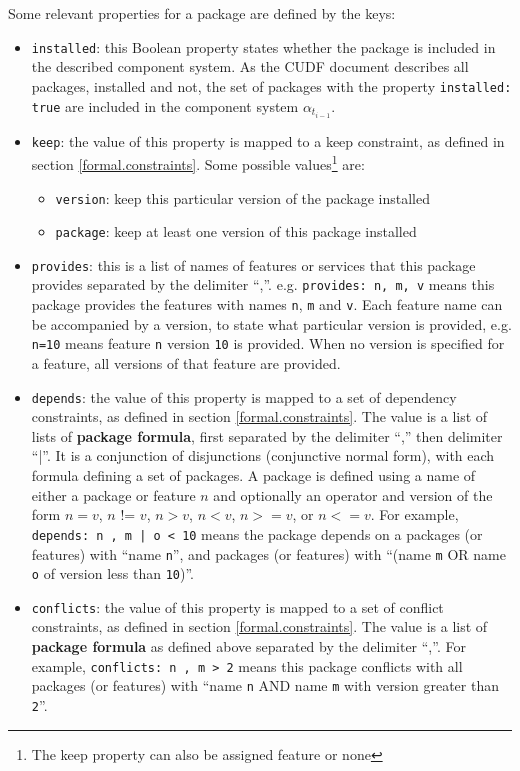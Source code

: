 Some relevant properties for a package are defined by the keys:
\begin{itemize}
  \item \verb+installed+: this Boolean property states whether the package is included in the described component system. 
  As the CUDF document describes all packages, installed and not, the set of packages with the property \verb+installed: true+ are included in the component system $\alpha_{t_{i-1}}$.
  \item \verb+keep+: the value of this property is mapped to a keep constraint, as defined in section \ref{formal.constraints}.
  Some possible values\footnote{The keep property can also be assigned feature or none} are:
	  	\begin{itemize}
	  		\item \verb+version+: keep this particular version of the package installed
	  		\item \verb+package+: keep at least one version of this package installed
		\end{itemize}
  \item \verb+provides+: this is a list of names of features or services that this package provides separated by the delimiter ``,''.
  e.g. \verb+provides: n, m, v+ means this package provides the features with names \verb+n+, \verb+m+ and \verb+v+.
  Each feature name can be accompanied by a version, to state what particular version is provided, e.g. \verb+n=10+ means feature \verb+n+ version \verb+10+ is provided.
  When no version is specified for a feature, all versions of that feature are provided.
  \item \verb+depends+: the value of this property is mapped to a set of dependency constraints, as defined in section \ref{formal.constraints}.
  The value is a list of lists of \textbf{package formula}, first separated by the delimiter ``,'' then delimiter ``|''.
  It is a conjunction of disjunctions (conjunctive normal form), with each formula defining a set of packages.
  A package is defined using a name of either a package or feature $n$ and optionally an operator and version of the form  $n = v$, $n$ != $v$, $n > v$, $n < v$, $n >= v$, or $n <= v$.
  For example, \verb+depends: n , m | o < 10+ means the package depends on a packages (or features) with ``name \verb+n+'',
   and  packages (or features) with ``(name \verb+m+ OR name \verb+o+ of version less than \verb+10+)''.  
  \item \verb+conflicts+: the value of this property is mapped to a set of conflict constraints, as defined in section \ref{formal.constraints}.
  The value is a list of \textbf{package formula} as defined above separated by the delimiter ``,''.
  For example, \verb+conflicts: n , m > 2+ means this package conflicts with all packages (or features) with ``name \verb+n+ AND name \verb+m+ with version greater than \verb+2+''.
\end{itemize}

